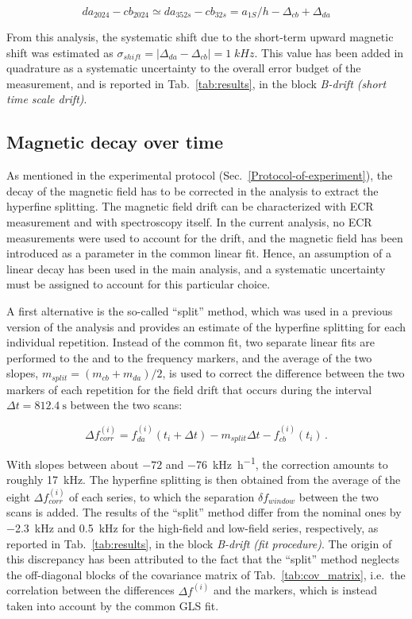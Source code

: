 \begin{equation}
da_{2024} - cb_{2024} \simeq da_{352s} - cb_{32s} = a_{1S}/h - \Delta_{cb} + \Delta_{da}
\end{equation}

From this analysis, the systematic shift due to the short-term upward magnetic shift was estimated as $\sigma_{shift} = |  \Delta_{da} - \Delta_{cb}| = 1 \; kHz$. This value has been added in quadrature as a systematic uncertainty to the overall error budget of the measurement, and is reported in Tab.~\ref{tab:results}, in the block \textit{B-drift (short time scale drift)}.


\subsection{Magnetic decay over time} \label{sec:decaySystematic}

As mentioned in the experimental protocol (Sec.~\ref{Protocol-of-experiment}), the decay of the magnetic field has to be corrected in the analysis to extract the hyperfine splitting. The magnetic field drift can be characterized with ECR measurement and with spectroscopy itself. In the current analysis, no ECR measurements were used to account for the drift, and the magnetic field has been introduced as a parameter in the common linear fit. Hence, an assumption of a linear decay has been used in the main analysis, and a systematic uncertainty must be assigned to account for this particular choice.

A first alternative is the so-called ``split'' method, which was used in a previous version of the analysis and provides an estimate of the hyperfine splitting for each individual repetition. Instead of the common fit, two separate linear fits are performed to the \cb and to the \da frequency markers, and the average of the two slopes, $m_{split} = (m_{cb} + m_{da})/2$, is used to correct the difference between the two markers of each repetition for the field drift that occurs during the interval $\Delta t = \SI{812.4}{\second}$ between the two scans:

\begin{equation}
\Delta f^{(i)}_{corr} = f_{da}^{(i)}(t_i + \Delta t) - m_{split} \Delta t - f_{cb}^{(i)}(t_i) \, .
\end{equation}

With slopes between about $-72$ and \SI{-76}{\kilo\hertz\per\hour}, the correction amounts to roughly \SI{17}{\kilo\hertz}. The hyperfine splitting is then obtained from the average of the eight $\Delta f^{(i)}_{corr}$ of each series, to which the separation $\delta f_{window}$ between the two scans is added. The results of the ``split'' method differ from the nominal ones by \SI{-2.3}{\kilo\hertz} and \SI{+0.5}{\kilo\hertz} for the high-field and low-field series, respectively, as reported in Tab.~\ref{tab:results}, in the block \textit{B-drift (fit procedure)}. The origin of this discrepancy has been attributed to the fact that the ``split'' method neglects the off-diagonal blocks of the covariance matrix of Tab.~\ref{tab:cov_matrix}, i.e.\ the correlation between the differences $\Delta f^{(i)}$ and the \cb markers, which is instead taken into account by the common GLS fit.


